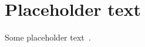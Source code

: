
\section{Placeholder text}
\label{sec:placeholder-text}
%
Some placeholder text~\cite{misner1973}.
